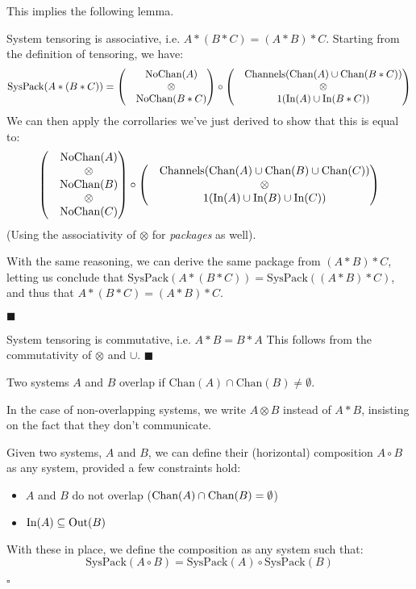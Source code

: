 This implies the following lemma.

\begin{lemma}
System tensoring is associative, i.e. $A * (B * C) = (A * B) * C$.
 Starting from the definition of tensoring, we have:
$$
\text{SysPack}(A * (B * C)) =
\begin{pmatrix}
&\text{NoChan}(A)\cr
&\otimes\cr
&\text{NoChan}(B * C)\cr
\end{pmatrix}
\circ
\begin{pmatrix}
&\text{Channels}(\text{Chan}(A) \cup \text{Chan}(B * C))\cr
&\otimes\cr
&1(\text{In}(A) \cup \text{In}(B * C))\cr
\end{pmatrix}
$$
We can then apply the corrollaries we've just derived to show that this
is equal to:
$$
\begin{pmatrix}
&\text{NoChan}(A)\cr
&\otimes\cr
&\text{NoChan}(B)\cr
&\otimes\cr
&\text{NoChan}(C)\cr
\end{pmatrix}
\circ
\begin{pmatrix}
  &\text{Channels}(\text{Chan}(A) \cup \text{Chan}(B) \cup \text{Chan}(C))\cr
&\otimes\cr
  &1(\text{In}(A) \cup \text{In}(B) \cup \text{In}(C))\cr
\end{pmatrix}
$$
(Using the associativity of $\otimes$ for \emph{packages} as well).

With the same reasoning, we can derive the same package from $(A * B) * C$,
letting us conclude that $\text{SysPack}(A * (B * C)) = \text{SysPack}((A * B) * C)$,
and thus that $A * (B * C) = (A * B) * C$.

$\blacksquare$
\end{lemma}

\begin{lemma}
System tensoring is commutative, i.e. $A * B = B * A$
 This follows from the commutativity of $\otimes$ and $\cup$.
$\blacksquare$
\end{lemma}

\begin{definition}
Two systems $A$ and $B$ overlap if $\text{Chan}(A) \cap \text{Chan}(B) \neq \emptyset$.

In the case of non-overlapping systems, we write $A \otimes B$ instead of $A * B$,
insisting on the fact that they don't communicate.
\end{definition}

\begin{definition}
Given two systems, $A$ and $B$, we can define their (horizontal) composition
$A \circ B$ as any system, provided a few constraints hold:
\begin{itemize}
\item $A$ and $B$ do not overlap ($\text{Chan}(A) \cap \text{Chan}(B) = \emptyset$)
\item $\text{In}(A) \subseteq \text{Out}(B)$
\end{itemize}

With these in place, we define the composition as any system such that:
$$
\text{SysPack}(A \circ B) =
\text{SysPack}(A) \circ \text{SysPack}(B)
$$

$\square$
\end{definition}

